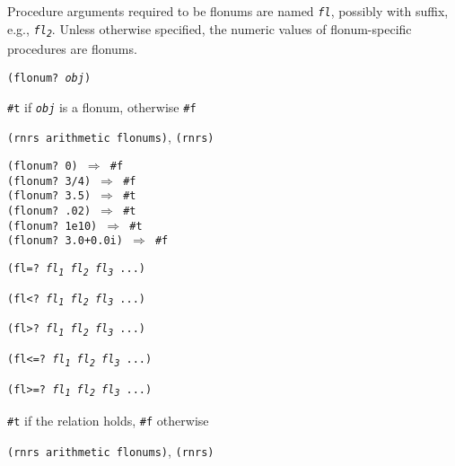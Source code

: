 Procedure arguments required to be flonums are named \texttt{\textit{fl}}, possibly
with suffix, e.g., \texttt{\textit{fl\textsubscript{2}}}.
Unless otherwise specified, the numeric values of flonum-specific
procedures are flonums.

\begin{description}

\label{objects_s177}\item[procedure] \texttt{(flonum? \textit{obj})}



\item[returns] \texttt{\#{}t} if \texttt{\textit{obj}} is a flonum, otherwise \texttt{\#{}f}


\item[libraries] \texttt{(rnrs arithmetic flonums)}, \texttt{(rnrs)}
\end{description}


\begin{alltt}
(flonum? 0) \(\Rightarrow\) \#{}f
(flonum? 3/4) \(\Rightarrow\) \#{}f
(flonum? 3.5) \(\Rightarrow\) \#{}t
(flonum? .02) \(\Rightarrow\) \#{}t
(flonum? 1e10) \(\Rightarrow\) \#{}t
(flonum? 3.0+0.0i) \(\Rightarrow\) \#{}f
\end{alltt}

\begin{description}

\label{objects_s178}\item[procedure] \texttt{(fl=? \textit{fl\textsubscript{1}} \textit{fl\textsubscript{2}} \textit{fl\textsubscript{3}} ...)}



\item[procedure] \texttt{(fl\textless{}? \textit{fl\textsubscript{1}} \textit{fl\textsubscript{2}} \textit{fl\textsubscript{3}} ...)}



\item[procedure] \texttt{(fl\textgreater{}? \textit{fl\textsubscript{1}} \textit{fl\textsubscript{2}} \textit{fl\textsubscript{3}} ...)}



\item[procedure] \texttt{(fl\textless{}=? \textit{fl\textsubscript{1}} \textit{fl\textsubscript{2}} \textit{fl\textsubscript{3}} ...)}



\item[procedure] \texttt{(fl\textgreater{}=? \textit{fl\textsubscript{1}} \textit{fl\textsubscript{2}} \textit{fl\textsubscript{3}} ...)}



\item[returns] \texttt{\#{}t} if the relation holds, \texttt{\#{}f} otherwise


\item[libraries] \texttt{(rnrs arithmetic flonums)}, \texttt{(rnrs)}
\end{description}


